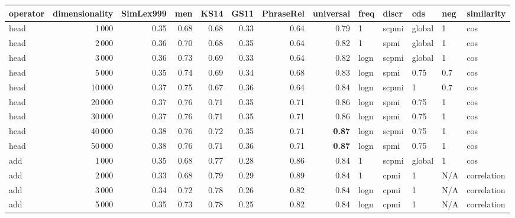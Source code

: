 \begin{tabular}{lrrrrrrrlllll}
\toprule
operator &  dimensionality &  SimLex999 &   men &  KS14 &  GS11 &  PhraseRel &  universal &  freq &  discr &     cds &  neg &     similarity \\
\midrule
    head &            1\,000 &       0.35 &  0.68 &  0.68 &  0.33 &       0.64 &       0.79 &     1 &  scpmi &  global &    1 &            cos \\
    head &            2\,000 &       0.36 &  0.70 &  0.68 &  0.35 &       0.64 &       0.82 &     1 &   spmi &  global &    1 &            cos \\
    head &            3\,000 &       0.36 &  0.73 &  0.69 &  0.33 &       0.64 &       0.82 &  logn &  scpmi &  global &    1 &            cos \\
    head &            5\,000 &       0.35 &  0.74 &  0.69 &  0.34 &       0.68 &       0.83 &  logn &   spmi &    0.75 &  0.7 &            cos \\
    head &           10\,000 &       0.37 &  0.75 &  0.67 &  0.36 &       0.64 &       0.84 &  logn &  scpmi &       1 &  0.7 &            cos \\
    head &           20\,000 &       0.37 &  0.76 &  0.71 &  0.35 &       0.71 &       0.86 &  logn &   spmi &    0.75 &    1 &            cos \\
    head &           30\,000 &       0.37 &  0.76 &  0.71 &  0.35 &       0.71 &       0.86 &  logn &   spmi &    0.75 &    1 &            cos \\
    head &           40\,000 &       0.38 &  0.76 &  0.72 &  0.35 &       0.71 &       \textbf{0.87} &  logn &  scpmi &    0.75 &    1 &            cos \\
    head &           50\,000 &       0.38 &  0.76 &  0.71 &  0.36 &       0.71 &       \textbf{0.87} &  logn &   spmi &    0.75 &    1 &            cos \\ \addlinespace
     add &            1\,000 &       0.35 &  0.68 &  0.77 &  0.28 &       0.86 &       0.84 &     1 &  scpmi &  global &    1 &            cos \\
     add &            2\,000 &       0.33 &  0.68 &  0.79 &  0.29 &       0.89 &       0.84 &     1 &   cpmi &       1 &  N/A &    correlation \\
     add &            3\,000 &       0.34 &  0.72 &  0.78 &  0.26 &       0.82 &       0.84 &  logn &   cpmi &       1 &  N/A &    correlation \\
     add &            5\,000 &       0.35 &  0.73 &  0.78 &  0.25 &       0.82 &       0.84 &  logn &   cpmi &       1 &  N/A &    correlation \\

\end{tabular}

